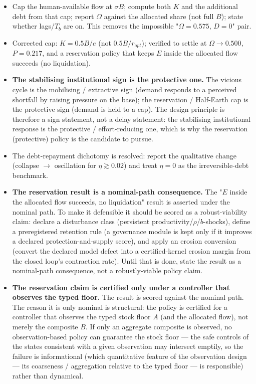 \documentclass[11pt]{article}
\begin{document}
\begin{itemize}
\item Cap the human-available flow at $\sigma{} B$; compute both $K$ and the additional debt from that cap; report $\Omega{}$ against the allocated share (not full $B$); state whether lags/$T_{b}$ are on. This removes the impossible "$\Omega{} = 0.575$, $D = 0$" pair.
\item Corrected cap: $K = 0.5 B / e$ (not $0.5 B / r_{opt}$); verified to settle at $\Omega{} \to{} 0.500$, $P = 0.217$, and a reservation policy that keeps $E$ inside the allocated flow succeeds (no liquidation).
\item \textbf{The stabilising institutional sign is the protective one.} The vicious cycle is the mobilising / extractive sign (demand responds to a perceived shortfall by raising pressure on the base); the reservation / Half-Earth cap is the protective sign (demand is held to a cap). The design principle is therefore a sign statement, not a delay statement: the stabilising institutional response is the protective / effort-reducing one, which is why the reservation (protective) policy is the candidate to pursue.
\item The debt-repayment dichotomy is resolved: report the qualitative change (collapse \ensuremath{\to{}} oscillation for $\eta{} \gtrsim{} 0.02$) and treat $\eta{} = 0$ as the irreversible-debt benchmark.
\item \textbf{The reservation result is a nominal-path consequence.} The "$E$ inside the allocated flow succeeds, no liquidation" result is asserted under the nominal path. To make it defensible it should be scored as a robust-viability claim: declare a disturbance class (persistent productivity/$\rho{}$/$b$-shocks), define a preregistered retention rule (a governance module is kept only if it improves a declared protection-and-supply score), and apply an erosion conversion (convert the declared model defect into a certified-kernel erosion margin from the closed loop's contraction rate). Until that is done, state the result as a nominal-path consequence, not a robustly-viable policy claim.
\item \textbf{The reservation claim is certified only under a controller that observes the typed floor.} The result is scored against the nominal path. The reason it is only nominal is structural: the policy is certified for a controller that observes the typed stock floor $A$ (and the allocated flow), not merely the composite $B$. If only an aggregate composite is observed, no observation-based policy can guarantee the stock floor — the safe controls of the states consistent with a given observation may intersect emptily, so the failure is informational (which quantitative feature of the observation design — its coarseness / aggregation relative to the typed floor — is responsible) rather than dynamical.

\end{itemize}
\end{document}
